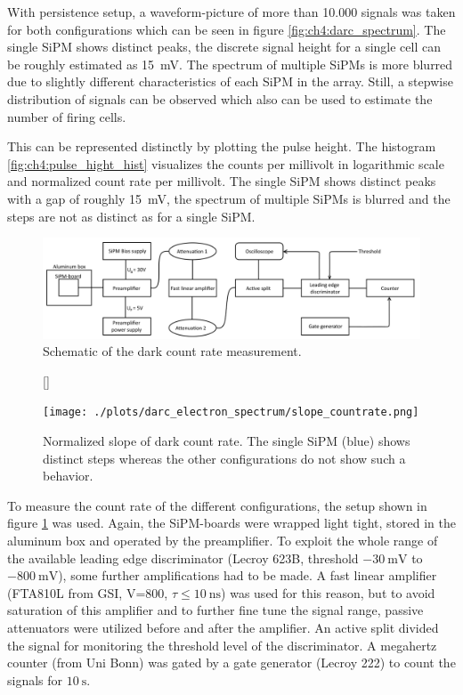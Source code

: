 With persistence setup, a waveform-picture of more than 10.000 signals was taken for both configurations which can be seen in figure \ref{fig:ch4:darc_spectrum}. The single SiPM shows distinct peaks, the discrete signal height for a single cell can be roughly estimated as \SI{15}{\milli\volt}. The spectrum of multiple SiPMs is more blurred due to slightly different characteristics of each SiPM in the array. Still, a stepwise distribution of signals can be observed which also can be used to estimate the number of firing cells. \par  
This can be represented distinctly by plotting the pulse height. The histogram \ref{fig:ch4:pulse_hight_hist} visualizes the counts per millivolt in logarithmic scale and normalized count rate per millivolt. The single SiPM shows distinct peaks with a gap of roughly \SI{15}{\milli\volt}, the spectrum of multiple SiPMs is blurred and the steps are not as distinct as for a single SiPM. \par 
\begin{figure}[t]
	\centering
	\includegraphics[width=1\linewidth]{./graphics/ch4/scheme_count_rate.png}
	\caption[Schematic of the dark count rate measurement]{Schematic of the dark count rate measurement.}
	\label{fig:ch4:scheme_rate}
\end{figure}
\begin{figure}[b]
	[\FBwidth]
	{\caption[Slope of the dark count rate]{Normalized slope of dark count rate. The single SiPM (blue) shows distinct steps whereas the other configurations do not show such a behavior.}    
		\label{fig:ch4:slope_countrate}}
	{\texttt{[image: ./plots/darc\_electron\_spectrum/slope\_countrate.png]}}
\end{figure}
To measure the count rate of the different configurations, the setup shown in figure \ref{fig:ch4:scheme_rate} was used. Again, the SiPM-boards were wrapped light tight, stored in the aluminum box and operated by the preamplifier. To exploit the whole range of the available leading edge discriminator (Lecroy 623B, threshold $\SI{-30}{\milli\volt}$ to $\SI{-800}{\milli\volt}$), some further amplifications had to be made. A fast linear amplifier (FTA810L from GSI, V=800, $\tau\leq\SI{10}{\nano\second}$) was used for this reason, but to avoid saturation of this amplifier and to further fine tune the signal range, passive attenuators were utilized before and after the amplifier. An active split divided the signal for monitoring the threshold level of the discriminator. A megahertz counter (from Uni Bonn) was gated by a gate generator (Lecroy 222) to count the signals for $\SI{10}{\second}$. \par 
